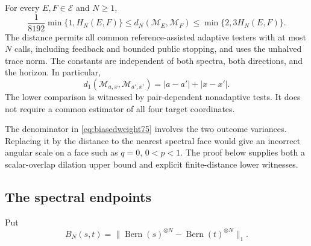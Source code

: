 \begin{theorem}
\label{thm:biasedmetric75}
For every $E,F\in\mathcal E$ and $N\ge1$,
\begin{equation}\label{eq:biasedmetric75}
 \frac1{8192}\min\{1,H_N(E,F)\}
 \le d_N(\mathcal M_E,\mathcal M_F)
 \le\min\{2,3H_N(E,F)\}.
\end{equation}
The distance permits all common reference-assisted adaptive testers
with at most $N$ calls, including feedback and bounded public stopping,
and uses the unhalved trace norm.  The constants are independent of
both spectra, both directions, and the horizon.  In particular,
\begin{equation}\label{eq:biasedoneuse75}
 d_1(\mathcal M_{a,x},\mathcal M_{a',x'})
                   =|a-a'|+|x-x'|.
\end{equation}
The lower comparison is witnessed by pair-dependent nonadaptive
tests.  It does not require a common estimator of all four target
coordinates.
\end{theorem}

The denominator in \eqref{eq:biasedweight75} involves the two
outcome variances.  Replacing it by the distance to the nearest
spectral face would give an incorrect angular scale on a face such
as $q=0$, $0<p<1$.  The proof below supplies both a scalar-overlap
dilation upper bound and explicit finite-distance lower witnesses.

\subsection{The spectral endpoints}
Put
\[
 B_N(s,t)=\|\operatorname{Bern}(s)^{\otimes N}
                    -\operatorname{Bern}(t)^{\otimes N}\|_1.
\]

